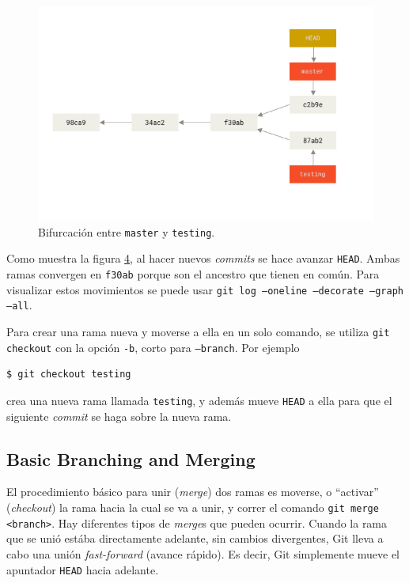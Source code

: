 \documentclass[spanish, 12pt, a4paper]{article}
\begin{document}
\begin{figure}
\centering
\includegraphics{figs/advance-master.png}
\caption{Bifurcación entre \passthrough{\lstinline!master!} y
\passthrough{\lstinline!testing!}.{}}
\end{figure}

Como muestra la figura \protect\hyperlink{fig:bifurcacion}{4}, al hacer
nuevos \emph{commits} se hace avanzar \passthrough{\lstinline!HEAD!}.
Ambas ramas convergen en \passthrough{\lstinline!f30ab!} porque son el
ancestro que tienen en común. Para visualizar estos movimientos se puede
usar \passthrough{\lstinline!git log –oneline –decorate –graph –all!}.

Para crear una rama nueva y moverse a ella en un solo comando, se
utiliza \passthrough{\lstinline!git checkout!} con la opción
\passthrough{\lstinline!-b!}, corto para
\passthrough{\lstinline!–branch!}. Por ejemplo

\begin{lstlisting}
$ git checkout testing
\end{lstlisting}

crea una nueva rama llamada \passthrough{\lstinline!testing!}, y además
mueve \passthrough{\lstinline!HEAD!} a ella para que el siguiente
\emph{commit} se haga sobre la nueva rama.

\subsection{Basic Branching and Merging}

El procedimiento básico para unir (\emph{merge}) dos ramas es moverse, o
``activar'' (\emph{checkout}) la rama hacia la cual se va a unir, y
correr el comando \passthrough{\lstinline!git merge <branch>!}. Hay
diferentes tipos de \emph{merge}s que pueden ocurrir. Cuando la rama que
se unió estába directamente adelante, sin cambios divergentes, Git lleva
a cabo una unión \emph{fast-forward} (avance rápido). Es decir, Git
simplemente mueve el apuntador \passthrough{\lstinline!HEAD!} hacia
adelante.
\end{document}
